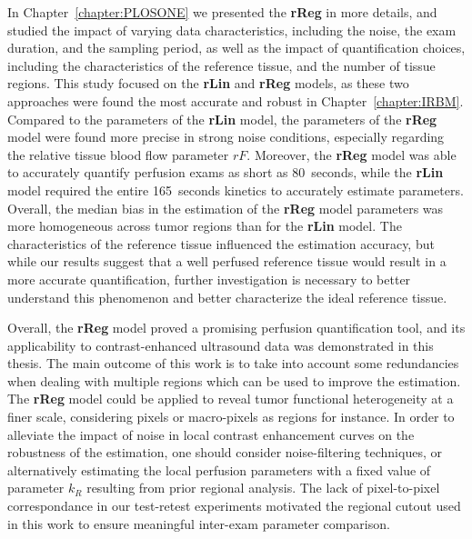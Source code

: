 In Chapter~\ref{chapter:PLOSONE} we presented the \textbf{rReg} in more details, and studied the impact of varying data characteristics, including the noise, the exam duration, and the sampling period, as well as the impact of quantification choices, including the characteristics of the reference tissue, and the number of tissue regions.
This study focused on the \textbf{rLin} and \textbf{rReg} models, as these two approaches were found the most accurate and robust in Chapter~\ref{chapter:IRBM}.
Compared to the parameters of the \textbf{rLin} model, the parameters of the \textbf{rReg} model were found more precise in strong noise conditions, especially regarding the relative tissue blood flow parameter $rF$.
Moreover, the \textbf{rReg} model was able to accurately quantify perfusion exams as short as 80~seconds, while the \textbf{rLin} model required the entire 165~seconds kinetics to accurately estimate parameters.
Overall, the median bias in the estimation of the \textbf{rReg} model parameters was more homogeneous across tumor regions than for the \textbf{rLin} model.
The characteristics of the reference tissue influenced the estimation accuracy, but while our results suggest that a well perfused reference tissue would result in a more accurate quantification, further investigation is necessary to better understand this phenomenon and better characterize the ideal reference tissue.

Overall, the \textbf{rReg} model proved a promising perfusion quantification tool, and its applicability to contrast-enhanced ultrasound data was demonstrated in this thesis.
The main outcome of this work is to take into account some redundancies when dealing with multiple regions which can be used to improve the estimation.
The \textbf{rReg} model could be applied to reveal tumor functional heterogeneity at a finer scale, considering pixels or macro-pixels as regions for instance.
In order to alleviate the impact of noise in local contrast enhancement curves on the robustness of the estimation, one should consider noise-filtering techniques, or alternatively estimating the local perfusion parameters with a fixed value of parameter $k_R$ resulting from prior regional analysis.
The lack of pixel-to-pixel correspondance in our test-retest experiments motivated the regional cutout used in this work to ensure meaningful inter-exam parameter comparison.

